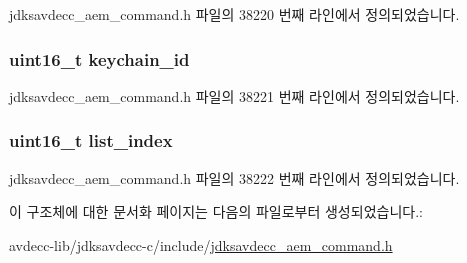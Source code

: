 jdksavdecc\+\_\+aem\+\_\+command.\+h 파일의 38220 번째 라인에서 정의되었습니다.

\subsubsection[{\texorpdfstring{keychain\+\_\+id}{keychain_id}}]{\setlength{\rightskip}{0pt plus 5cm}uint16\+\_\+t keychain\+\_\+id}\hypertarget{structjdksavdecc__aem__command__auth__get__keychain__list_a10ed6547e01665c453e2a40b142f7526}{}\label{structjdksavdecc__aem__command__auth__get__keychain__list_a10ed6547e01665c453e2a40b142f7526}


jdksavdecc\+\_\+aem\+\_\+command.\+h 파일의 38221 번째 라인에서 정의되었습니다.

\subsubsection[{\texorpdfstring{list\+\_\+index}{list_index}}]{\setlength{\rightskip}{0pt plus 5cm}uint16\+\_\+t list\+\_\+index}\hypertarget{structjdksavdecc__aem__command__auth__get__keychain__list_a2860632dbc7912d3e434203be8f2d9da}{}\label{structjdksavdecc__aem__command__auth__get__keychain__list_a2860632dbc7912d3e434203be8f2d9da}


jdksavdecc\+\_\+aem\+\_\+command.\+h 파일의 38222 번째 라인에서 정의되었습니다.



이 구조체에 대한 문서화 페이지는 다음의 파일로부터 생성되었습니다.\+:\begin{DoxyCompactItemize}
\item 
avdecc-\/lib/jdksavdecc-\/c/include/\hyperlink{jdksavdecc__aem__command_8h}{jdksavdecc\+\_\+aem\+\_\+command.\+h}\end{DoxyCompactItemize}
